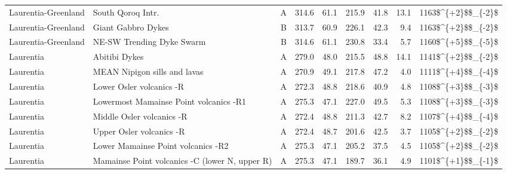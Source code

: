 \begin{longtable}{p{1 in}p{1 in}rrrrrrr}
           Laurentia-Greenland &                                  South Qoroq Intr. &      A &     314.6 &      61.1 & 215.9 &  41.8 &      13.1 &     1163\$\textasciicircum \{+2\}\$\$\_\{-2\}\$ \\
           Laurentia-Greenland &                                 Giant Gabbro Dykes &      B &     313.7 &      60.9 & 226.1 &  42.3 &       9.4 &     1163\$\textasciicircum \{+2\}\$\$\_\{-2\}\$ \\
           Laurentia-Greenland &                          NE-SW Trending Dyke Swarm &      B &     314.6 &      61.1 & 230.8 &  33.4 &       5.7 &     1160\$\textasciicircum \{+5\}\$\$\_\{-5\}\$ \\
                     Laurentia &                                      Abitibi Dykes &      A &     279.0 &      48.0 & 215.5 &  48.8 &      14.1 &     1141\$\textasciicircum \{+2\}\$\$\_\{-2\}\$ \\
                     Laurentia &                       MEAN Nipigon sills and lavas &      A &     270.9 &      49.1 & 217.8 &  47.2 &       4.0 &     1111\$\textasciicircum \{+4\}\$\$\_\{-4\}\$ \\
                     Laurentia &                           Lower Osler volcanics -R &      A &     272.3 &      48.8 & 218.6 &  40.9 &       4.8 &     1108\$\textasciicircum \{+3\}\$\$\_\{-3\}\$ \\
                     Laurentia &             Lowermost Mamainse Point volcanics -R1 &      A &     275.3 &      47.1 & 227.0 &  49.5 &       5.3 &     1108\$\textasciicircum \{+3\}\$\$\_\{-3\}\$ \\
                     Laurentia &                          Middle Osler volcanics -R &      A &     272.4 &      48.8 & 211.3 &  42.7 &       8.2 &     1107\$\textasciicircum \{+4\}\$\$\_\{-4\}\$ \\
                     Laurentia &                           Upper Osler volcanics -R &      A &     272.4 &      48.7 & 201.6 &  42.5 &       3.7 &     1105\$\textasciicircum \{+2\}\$\$\_\{-2\}\$ \\
                     Laurentia &                 Lower Mamainse Point volcanics -R2 &      A &     275.3 &      47.1 & 205.2 &  37.5 &       4.5 &     1105\$\textasciicircum \{+2\}\$\$\_\{-2\}\$ \\
                     Laurentia &     Mamainse Point volcanics -C (lower N, upper R) &      A &     275.3 &      47.1 & 189.7 &  36.1 &       4.9 &     1101\$\textasciicircum \{+1\}\$\$\_\{-1\}\$ \\

\end{longtable}

